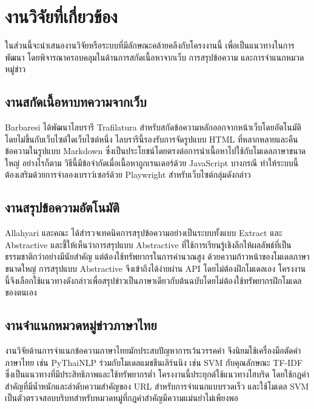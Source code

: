 \section{งานวิจัยที่เกี่ยวข้อง}

ในส่วนนี้จะนำเสนองานวิจัยหรือระบบที่มีลักษณะคล้ายคลึงกับโครงงานนี้ เพื่อเป็นแนวทางในการพัฒนา โดยพิจารณาครอบคลุมในด้านการสกัดเนื้อหาจากเว็บ การสรุปข้อความ และการจำแนกหมวดหมู่ข่าว

\subsection{งานสกัดเนื้อหาบทความจากเว็บ}

Barbaresi \cite{trafilatura2021} ได้พัฒนาไลบรารี Trafilatura สำหรับสกัดข้อความหลักออกจากหน้าเว็บโดยอัตโนมัติ โดยไม่ขึ้นกับเว็บไซต์ใดเว็บไซต์หนึ่ง ไลบรารีนี้รองรับการจัดรูปแบบ HTML ที่หลากหลายและคืนข้อความในรูปแบบ Markdown ซึ่งเป็นประโยชน์โดยตรงต่อการนำเนื้อหาไปใช้กับโมเดลภาษาขนาดใหญ่ อย่างไรก็ตาม วิธีนี้มีข้อจำกัดเมื่อเนื้อหาถูกเรนเดอร์ด้วย JavaScript บางกรณี ทำให้ระบบนี้ต้องเสริมด้วยการจำลองเบราว์เซอร์ด้วย Playwright สำหรับเว็บไซต์กลุ่มดังกล่าว

\subsection{งานสรุปข้อความอัตโนมัติ}

Allahyari และคณะ \cite{allahyari2017} ได้สำรวจเทคนิคการสรุปข้อความอย่างเป็นระบบทั้งแบบ Extract และ Abstractive และชี้ให้เห็นว่าการสรุปแบบ Abstractive ที่ใช้การเรียนรู้เชิงลึกให้ผลลัพธ์ที่เป็นธรรมชาติกว่าอย่างมีนัยสำคัญ แต่ต้องใช้ทรัพยากรในการคำนวณสูง ด้วยความก้าวหน้าของโมเดลภาษาขนาดใหญ่ \cite{gemini2024} การสรุปแบบ Abstractive จึงเข้าถึงได้ง่ายผ่าน API โดยไม่ต้องฝึกโมเดลเอง โครงงานนี้จึงเลือกใช้แนวทางดังกล่าวเพื่อสรุปข่าวเป็นภาษาเดียวกับต้นฉบับโดยไม่ต้องใช้ทรัพยากรฝึกโมเดลของตนเอง

\subsection{งานจำแนกหมวดหมู่ข่าวภาษาไทย}

งานวิจัยด้านการจำแนกข้อความภาษาไทยมักประสบปัญหาการเว้นวรรคคำ จึงนิยมใช้เครื่องมือตัดคำภาษาไทย เช่น PyThaiNLP \cite{pythainlp2021} ร่วมกับโมเดลแมชชีนเลิร์นนิง เช่น SVM กับคุณลักษณะ TF-IDF ซึ่งเป็นแนวทางที่มีประสิทธิภาพและใช้ทรัพยากรต่ำ โครงงานนี้ประยุกต์ใช้แนวทางไฮบริด โดยใช้กฎคำสำคัญที่มีน้ำหนักและลำดับความสำคัญของ URL สำหรับการจำแนกแบบรวดเร็ว และใช้โมเดล SVM เป็นตัวตรวจสอบบริบทสำหรับหมวดหมู่ที่กฎคำสำคัญมีความแม่นยำไม่เพียงพอ

